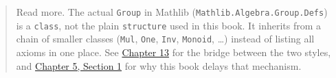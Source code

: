 \begin{quote}
Read more. The actual \texttt{Group} in Mathlib (\texttt{Mathlib.Algebra.Group.Defs}) is a \texttt{class}, not the plain \texttt{structure} used in this book. It inherits from a chain of smaller classes (\texttt{Mul}, \texttt{One}, \texttt{Inv}, \texttt{Monoid}, \ldots) instead of listing all axioms in one place. See \hyperref[sec:13-next-steps:02-moving-to-mathlib:1]{Chapter 13} for the bridge between the two styles, and \hyperref[sec:05-rigor-check:01-structure-vs-class:1]{Chapter 5, Section 1} for why this book delays that mechanism.
\end{quote}
